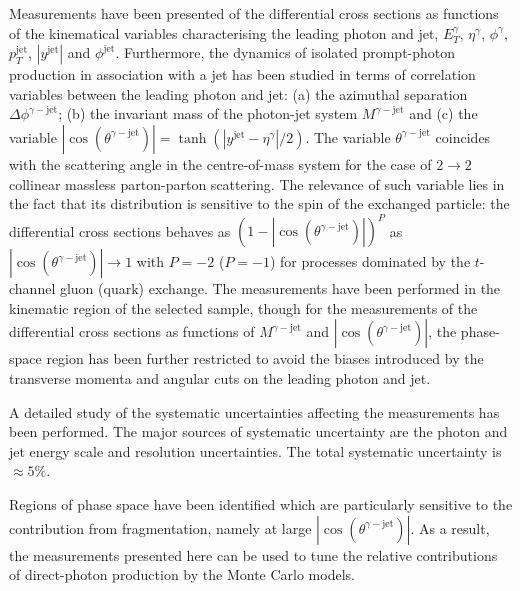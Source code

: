 \documentclass[12pt, twoside]{article}
\numberwithin{equation}{section}
\numberwithin{figure}{section}
\begin{document}
Measurements have been presented of the differential cross sections as functions of the kinematical variables characterising the leading photon and jet, $E^{\gamma}_{T}$, $\eta^{\gamma}$, $\phi^{\gamma}$, $p^{\text{jet}}_{T}$, $\left| y^{\text{jet}} \right|$ and $\phi^{\text{jet}}$. Furthermore, the dynamics of isolated prompt-photon production in association with a jet has been studied in terms of correlation variables between the leading photon and jet: (a) the azimuthal separation $\Delta \phi^{\gamma-\text{jet}}$; (b) the invariant mass of the photon-jet system $M^{\gamma-\text{jet}}$ and (c) the variable $\left| \cos \left( \theta^{\gamma-\text{jet}} \right) \right| = \tanh \left( \left| y^{\text{jet}} - \eta^{\gamma} \right| / 2 \right)$. The variable $\theta^{\gamma-\text{jet}}$ coincides with the scattering angle in the centre-of-mass system for the case of $2 \rightarrow 2$ collinear massless parton-parton scattering. The relevance of such variable lies in the fact that its distribution is sensitive to the spin of the exchanged particle: the differential cross sections behaves as $\left( 1 - \left| \cos \left( \theta^{\gamma-\text{jet}} \right) \right| \right)^{P}$ as $\left| \cos \left( \theta^{\gamma-\text{jet}} \right) \right| \rightarrow 1$ with $P = -2$ ($P = -1$) for processes dominated by the $t$-channel gluon (quark) exchange. The measurements have been performed in the kinematic region of the selected sample, though for the measurements of the differential cross sections as functions of $M^{\gamma-\text{jet}}$ and $\left| \cos \left( \theta^{\gamma-\text{jet}} \right) \right|$, the phase-space region has been further restricted to avoid the biases introduced by the transverse momenta and angular cuts on the leading photon and jet.

A detailed study of the systematic uncertainties affecting the measurements has been performed. The major sources of systematic uncertainty are the photon and jet energy scale and resolution uncertainties. The total systematic uncertainty is $\approx 5 \%$.

Regions of phase space have been identified which are particularly sensitive to the contribution from fragmentation, namely at large $\left| \cos \left( \theta^{\gamma-\text{jet}} \right) \right|$. As a result, the measurements presented here can be used to tune the relative contributions of direct-photon production by the Monte Carlo models.

\newpage
\thispagestyle{empty}
\phantom{ }
\end{document}
